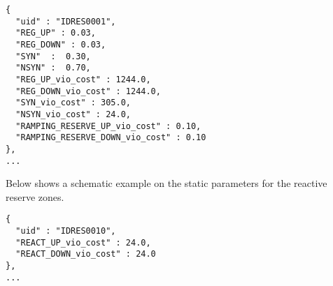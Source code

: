\begin{verbatim}
{
  "uid" : "IDRES0001",
  "REG_UP" : 0.03,
  "REG_DOWN" : 0.03,
  "SYN"  :  0.30,
  "NSYN" :  0.70,
  "REG_UP_vio_cost" : 1244.0,
  "REG_DOWN_vio_cost" : 1244.0,
  "SYN_vio_cost" : 305.0,
  "NSYN_vio_cost" : 24.0,  
  "RAMPING_RESERVE_UP_vio_cost" : 0.10,  
  "RAMPING_RESERVE_DOWN_vio_cost" : 0.10
},
...
\end{verbatim}

Below shows a schematic example on the static parameters for the reactive reserve zones. 
\begin{verbatim}
{
  "uid" : "IDRES0010",
  "REACT_UP_vio_cost" : 24.0,
  "REACT_DOWN_vio_cost" : 24.0
},
...
\end{verbatim}



